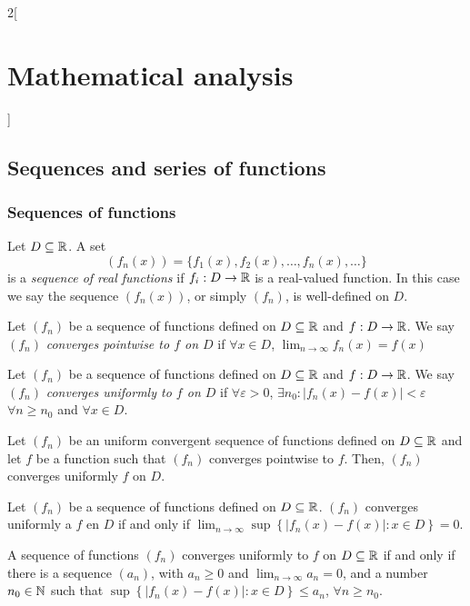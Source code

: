 \documentclass[../../../main.tex]{subfiles}
\begin{document}
\begin{multicols}{2}[\section{Mathematical analysis}]
  \subsection{Sequences and series of functions}
  \subsubsection{Sequences of functions}
  \begin{definition}
    Let $D\subseteq\mathbb{R} $. A set $$(f_n(x))=\{f_1(x),f_2(x),\ldots,f_n(x),\ldots\}$$ is a \textit{sequence of real functions} if $f_i:D\rightarrow\mathbb{R} $ is a real-valued function. In this case we say the sequence $(f_n(x))$, or simply $(f_n)$, is well-defined on $D$.
  \end{definition}
  \begin{definition}
    Let $(f_n)$ be a sequence of functions defined on $D\subseteq\mathbb{R} $ and $f:D\rightarrow\mathbb{R} $. We say $(f_n)$ \textit{converges pointwise to $f$ on $D$} if $\forall x\in D$, $\displaystyle\lim_{n\to\infty}f_n(x)=f(x)$
  \end{definition}
  \begin{definition}
    Let $(f_n)$ be a sequence of functions defined on $D\subseteq\mathbb{R} $ and $f:D\rightarrow\mathbb{R} $. We say $(f_n)$ \textit{converges uniformly to $f$ on $D$} if $\forall\varepsilon>0$, $\exists n_0:|f_n(x)-f(x)|<\varepsilon$ $\forall n\geq n_0$ and $\forall x\in D$.
  \end{definition}
  \begin{lemma}
    Let $(f_n)$ be an uniform convergent sequence of functions defined on $D\subseteq\mathbb{R} $ and let $f$ be a function such that $(f_n)$ converges pointwise to $f$. Then, $(f_n)$ converges uniformly $f$ on $D$.
  \end{lemma}
  \begin{lemma}
    Let $(f_n)$ be a sequence of functions defined on $D\subseteq\mathbb{R} $. $(f_n)$ converges uniformly a $f$ en $D$ if and only if $\displaystyle \lim_{n\to\infty}\sup\left\{|f_n(x)-f(x)|:x\in D\right\}=0$.
  \end{lemma}
  \begin{corollary}
    A sequence of functions $(f_n)$ converges uniformly to $f$ on $D\subseteq\mathbb{R} $ if and only if there is a sequence $(a_n)$, with $a_n\geq 0$ and $\displaystyle \lim_{n\to\infty} a_n=0$, and a number $\displaystyle n_0\in\mathbb{N} $ such that $\sup\left\{|f_n(x)-f(x)|: x\in D\right\}\leq a_n$, $\forall n\geq n_0$.
  \end{corollary}
  \begin{theorem}

\end{theorem}
\end{multicols}
\end{document}
